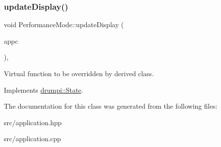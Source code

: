 \subsubsection{\texorpdfstring{update\+Display()}{updateDisplay()}}
{\footnotesize\ttfamily void Performance\+Mode\+::update\+Display (\begin{DoxyParamCaption}\item[{\hyperlink{classdrumpi_1_1ApplicationCallback}{Application\+Callback} $\ast$}]{appc }\end{DoxyParamCaption})\hspace{0.3cm}{\ttfamily [override]}, {\ttfamily [virtual]}}

Virtual function to be overridden by derived class. 

Implements \hyperlink{classdrumpi_1_1State_a400c5fc605ddec1e4fe18c361bf38ef2}{drumpi\+::\+State}.



The documentation for this class was generated from the following files\+:\begin{DoxyCompactItemize}
\item 
src/application.\+hpp\item 
src/application.\+cpp\end{DoxyCompactItemize}
